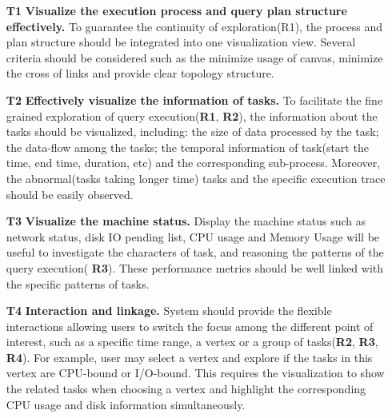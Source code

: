 \begin{itemize}
  \item[\textbf{T1}]\textbf{Visualize the execution process and query plan structure effectively.} To guarantee the continuity of exploration(R1), the process and plan structure should be integrated into one visualization view. Several criteria should be considered such as the minimize usage of canvas, minimize the cross of links and provide clear topology structure.
  \item[\textbf{T2}]\textbf{Effectively visualize the information of tasks.} To facilitate the fine grained exploration of query execution(\textbf{R1}, \textbf{R2}), the information about the tasks should be visualized, including: the size of data processed by the task; the data-flow among the tasks; the temporal information of task(start the time, end time, duration, etc) and the corresponding sub-process. Moreover, the abnormal(tasks taking longer time) tasks and the specific execution trace should be easily observed.
  \item[\textbf{T3}]\textbf{Visualize the machine status.} Display the machine status such as network status, disk IO pending list, CPU usage and Memory Usage will be useful to investigate the characters of task, and reasoning the patterns of the query execution( \textbf{R3}). These performance metrics should be well linked with the specific patterns of tasks. 
  \item[\textbf{T4}]\textbf{Interaction and linkage.} System should provide the flexible interactions allowing users to switch the focus among the different point of interest, such as a specific time range, a vertex or a group of tasks(\textbf{R2}, \textbf{R3}, \textbf{R4}). For example, user may select a vertex and explore if the tasks in this vertex are CPU-bound or I/O-bound. This requires the visualization to show the related tasks when choosing a vertex and highlight the corresponding CPU usage and disk information simultaneously.


\end{itemize}
